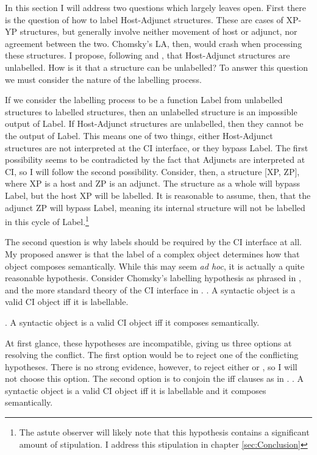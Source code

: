 \documentclass[MilwayThesis]{subfiles}
\begin{document}
In this section I will address two questions which \textcite{chomsky2013problems,chomsky2015problems} largely leaves open.
First there is the question of how to label Host-Adjunct structures.
These are cases of XP-YP structures, but generally involve neither movement of host or adjunct, nor agreement between the two.
Chomsky's LA, then, would crash when processing these structures.
I propose, following \textcite{hornstein2009theory} and \textcite{chametzky1996theory}, that Host-Adjunct structures are unlabelled.
How is it that a structure can be unlabelled?
To answer this question we must consider the nature of the labelling process. 

If we consider the labelling process to be a function Label from unlabelled structures to labelled structures, then an unlabelled structure is an impossible output of Label.
If Host-Adjunct structures are unlabelled, then they cannot be the output of Label.
This means one of two things, either Host-Adjunct structures are not interpreted at the CI interface, or they bypass Label.
The first possibility seems to be contradicted by the fact that Adjuncts are interpreted at CI, so I will follow the second possibility.
Consider, then, a structure [XP, ZP], where XP is a host and ZP is an adjunct.
The structure as a whole will bypass Label, but the host XP will be labelled.
It is reasonable to assume, then, that the adjunct ZP will bypass Label, meaning its internal structure will not be labelled in this cycle of Label.\footnote{The astute observer will likely note that this hypothesis contains a significant amount of stipulation.
I address this stipulation in chapter \ref{sec:Conclusion}}

The second question is why labels should be required by the CI interface at all.
My proposed answer is that the label of a complex object determines how that object composes semantically.
While this may seem \textit{ad hoc}, it is actually a quite reasonable hypothesis.
Consider Chomsky's labelling hypothesis as phrased in \Next, and the more standard theory of the CI interface in \NNext.
\ex. A syntactic object is a valid CI object iff it is labellable.

\ex. A syntactic object is a valid CI object iff it composes semantically.

At first glance, these hypotheses are incompatible, giving us three options at resolving the conflict.
The first option would be to reject one of the conflicting hypotheses.
There is no strong evidence, however, to reject either \LLast or \Last, so I will not choose this option.
The second option is to conjoin the iff clauses as in \Next.
\ex. A syntactic object is a valid CI object iff it is labellable and it composes semantically.
\end{document}
